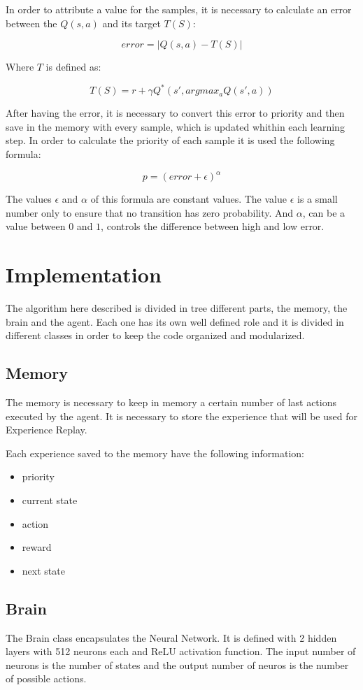 \documentclass{article}
\newcommand{\layers}{2}
\newcommand{\neurons}{512}
\begin{document}
In order to attribute a value for the samples, it is necessary to calculate an error between the $Q(s,a)$ and its target $T(S)$:

\[error=|Q(s,a)-T(S)|\]

Where $T$ is defined as:

\[T(S)=r+\gamma Q^*(s', argmax_a Q(s',a))\]

After having the error, it is necessary to convert this error to priority and then save in the memory with every sample, which is updated whithin each learning step. In order to calculate the priority of each sample it is used the following formula:

\[p = (error + \epsilon)^\alpha\]

The values $\epsilon$ and $\alpha$ of this formula are constant values. The value $\epsilon$ is a small number only to ensure that no transition has zero probability. And $\alpha$, can be a value between $0$ and $1$, controls the difference between high and low error.

\section{Implementation}
The algorithm here described is divided in tree different parts, the memory, the brain and the agent. Each one has its own well defined role and it is divided in different classes in order to keep the code organized and modularized.

\subsection{Memory}
The memory is necessary to keep in memory a certain number of last actions executed by the agent. It is necessary to store the experience that will be used for Experience Replay.

Each experience saved to the memory have the following information:

\begin{itemize}
	\item priority
	\item current state
	\item action
	\item reward
	\item next state
\end{itemize}

\subsection{Brain}
The Brain class encapsulates the Neural Network. It is defined with \layers{} hidden layers with \neurons{} neurons each and ReLU activation function. The input number of neurons is the number of states and the output number of neuros is the number of possible actions.
\end{document}
